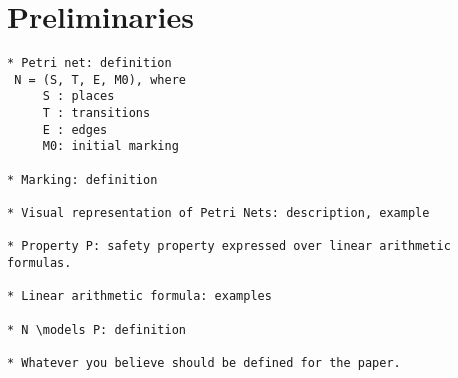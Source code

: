 \section{Preliminaries}


\begin{verbatim}
* Petri net: definition
 N = (S, T, E, M0), where
     S : places
     T : transitions
     E : edges
     M0: initial marking

* Marking: definition

* Visual representation of Petri Nets: description, example

* Property P: safety property expressed over linear arithmetic formulas.

* Linear arithmetic formula: examples

* N \models P: definition

* Whatever you believe should be defined for the paper.
\end{verbatim}

\iffalse
\begin{verbatim}
 Examples:
  x + y < 0
  x + y < 0 \\and x + z > 0
  x + y < 0 \\or  x + z > 0

 ~P = (x + y <  0 \\and x + z >  0) \\or  x + z >  0
  P = (x + y >= 0 \\or  x + z <= 0) \\and x + z <= 0
\end{verbatim}
\fi